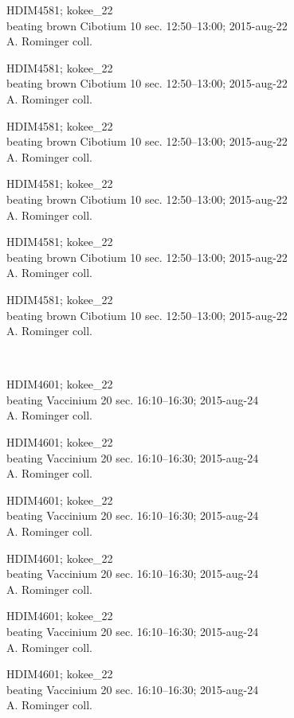 \documentclass[2pt]{extarticle}
\begin{document}
\noindent
\parbox{0.16\textwidth}{\tiny \raggedright \rule[-0.3\baselineskip]{0pt}{10pt}HDIM4581; kokee\_22\\ beating brown Cibotium 10 sec. 12:50--13:00; 2015-aug-22\\ A. Rominger coll.}
\parbox{0.16\textwidth}{\tiny \raggedright \rule[-0.3\baselineskip]{0pt}{10pt}HDIM4581; kokee\_22\\ beating brown Cibotium 10 sec. 12:50--13:00; 2015-aug-22\\ A. Rominger coll.}
\parbox{0.16\textwidth}{\tiny \raggedright \rule[-0.3\baselineskip]{0pt}{10pt}HDIM4581; kokee\_22\\ beating brown Cibotium 10 sec. 12:50--13:00; 2015-aug-22\\ A. Rominger coll.}
\parbox{0.16\textwidth}{\tiny \raggedright \rule[-0.3\baselineskip]{0pt}{10pt}HDIM4581; kokee\_22\\ beating brown Cibotium 10 sec. 12:50--13:00; 2015-aug-22\\ A. Rominger coll.}
\parbox{0.16\textwidth}{\tiny \raggedright \rule[-0.3\baselineskip]{0pt}{10pt}HDIM4581; kokee\_22\\ beating brown Cibotium 10 sec. 12:50--13:00; 2015-aug-22\\ A. Rominger coll.}
\parbox{0.16\textwidth}{\tiny \raggedright \rule[-0.3\baselineskip]{0pt}{10pt}HDIM4581; kokee\_22\\ beating brown Cibotium 10 sec. 12:50--13:00; 2015-aug-22\\ A. Rominger coll.} \\ 
\vspace{0.001in} 

\noindent
\parbox{0.16\textwidth}{\tiny \raggedright \rule[-0.3\baselineskip]{0pt}{10pt}HDIM4601; kokee\_22\\ beating Vaccinium 20 sec. 16:10--16:30; 2015-aug-24\\ A. Rominger coll.}
\parbox{0.16\textwidth}{\tiny \raggedright \rule[-0.3\baselineskip]{0pt}{10pt}HDIM4601; kokee\_22\\ beating Vaccinium 20 sec. 16:10--16:30; 2015-aug-24\\ A. Rominger coll.}
\parbox{0.16\textwidth}{\tiny \raggedright \rule[-0.3\baselineskip]{0pt}{10pt}HDIM4601; kokee\_22\\ beating Vaccinium 20 sec. 16:10--16:30; 2015-aug-24\\ A. Rominger coll.}
\parbox{0.16\textwidth}{\tiny \raggedright \rule[-0.3\baselineskip]{0pt}{10pt}HDIM4601; kokee\_22\\ beating Vaccinium 20 sec. 16:10--16:30; 2015-aug-24\\ A. Rominger coll.}
\parbox{0.16\textwidth}{\tiny \raggedright \rule[-0.3\baselineskip]{0pt}{10pt}HDIM4601; kokee\_22\\ beating Vaccinium 20 sec. 16:10--16:30; 2015-aug-24\\ A. Rominger coll.}
\parbox{0.16\textwidth}{\tiny \raggedright \rule[-0.3\baselineskip]{0pt}{10pt}HDIM4601; kokee\_22\\ beating Vaccinium 20 sec. 16:10--16:30; 2015-aug-24\\ A. Rominger coll.} \\ 
\vspace{0.001in} 
\end{document}
